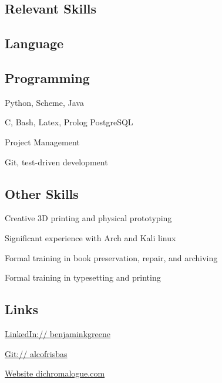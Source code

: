 \documentclass{cv}
\begin{document}
{}
\noindent{}
\begin{paracol}{2}
\begin{raggedright}
\section{Relevant Skills}
\subsection{Language}
\subsection{Programming}
\begin{closeitems}
\item Python, Scheme, Java
\item C, Bash, Latex, Prolog PostgreSQL
\item Project Management
\item Git, test-driven development
\end{closeitems}
\subsection{Other Skills}
\begin{closeitems}%
\item Creative 3D printing and physical prototyping
\item Significant experience with Arch and Kali linux
\item Formal training in book preservation, repair, and archiving
\item Formal training in typesetting and printing
\end{closeitems}
\subsection{Links}
\begin{closeitems}
\item \href{http://www.linkedin.com/in/benjaminkgreene}{LinkedIn:// \small{benjaminkgreene}}
\item \href{http://www.github.com/alcofrisbas}{Git:// \small{alcofrisbas}}
\item \href{http://www.dichromalogue.com}{Website \small{dichromalogue.com}}
\end{closeitems}

\end{raggedright}
\end{paracol}
\end{document}
